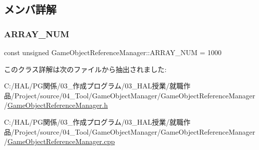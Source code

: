 \subsection{メンバ詳解}
\mbox{\label{class_game_object_reference_manager_a962d30b10c5b76353645773b2c1740ce}} 
\subsubsection{\texorpdfstring{A\+R\+R\+A\+Y\+\_\+\+N\+UM}{ARRAY\_NUM}}
{\footnotesize\ttfamily const unsigned Game\+Object\+Reference\+Manager\+::\+A\+R\+R\+A\+Y\+\_\+\+N\+UM = 1000\hspace{0.3cm}{\ttfamily [static]}}



このクラス詳解は次のファイルから抽出されました\+:\begin{DoxyCompactItemize}
\item 
C\+:/\+H\+A\+L/\+P\+G関係/03\+\_\+作成プログラム/03\+\_\+\+H\+A\+L授業/就職作品/\+Project/source/04\+\_\+\+Tool/\+Game\+Object\+Manager/\+Game\+Object\+Reference\+Manager/\mbox{\hyperlink{_game_object_reference_manager_8h}{Game\+Object\+Reference\+Manager.\+h}}\item 
C\+:/\+H\+A\+L/\+P\+G関係/03\+\_\+作成プログラム/03\+\_\+\+H\+A\+L授業/就職作品/\+Project/source/04\+\_\+\+Tool/\+Game\+Object\+Manager/\+Game\+Object\+Reference\+Manager/\mbox{\hyperlink{_game_object_reference_manager_8cpp}{Game\+Object\+Reference\+Manager.\+cpp}}\end{DoxyCompactItemize}
